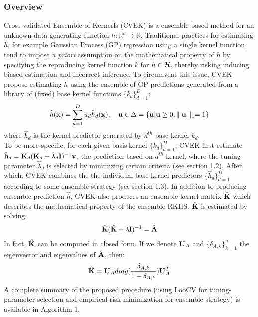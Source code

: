 \documentclass[11pt]{article}
\begin{document}
\subsubsection{{Overview}}
Cross-validated Ensemble of Kernerls (CVEK) \citep{liu_robust_2017} is a ensemble-based method for an unknown data-generating function $h: \mathbb{R}^p\rightarrow \mathbb{R}$. Traditional practices for estimating $h$, for example  Gaussian Process (GP) regression using a single kernel function, tend to impose \textit{a priori} assumption on the mathematical property of $h$ by specifying the reproducing kernel function $k$ for $h \in {\cal H}$, thereby risking inducing biased estimation and incorrect inference. To circumvent this issue, CVEK propose   estimating $h$ using the ensemble of GP predictions generated from a library of (fixed) base kernel functions $\{k_d\}_{d=1}^D$:
\begin{align}
\hat{h}({\bf x})=\sum_{d=1}^D u_d\hat{h}_d({\bf x}), \quad {\bf u} \in \Delta=\{{\bf u} | {\bf u} \geq 0, \parallel {\bf u} \parallel_1=1\}
\end{align}
where $\hat{h}_d$ is the kernel predictor generated by $d^{th}$ base kernel $k_d$.\\
To be more specific, for each given basis kernel $\{k_d\}_{d=1}^D$, CVEK first estimate $\hat{{\bf h}}_d={\bf K}_d({\bf K}_d+\hat{\lambda}_d{\bf I})^{-1}{\bf y}$, the prediction based on $d^{th}$ kernel, where the tuning parameter $\hat{\lambda}_d$ is selected by minimizing certain criteria (see section 1.2). After which, CVEK combines the the individual base kernel predictors $\{\hat{h}_d\}_{d=1}^D$ according to some ensemble strategy (see section 1.3). In addition to producing ensemble prediction $\hat{h}$, CVEK also produces an ensemble kernel matrix $\hat{{\bf K}}$ which describes the mathematical property of the ensemble RKHS. $\hat{{\bf K}}$ is estimated by solving:
\begin{align*}
\hat{{\bf K}}(\hat{{\bf K}}+\lambda {\bf I})^{-1}=\hat{{\bf A}}
\end{align*}
In fact, $\hat{{\bf K}}$ can be computed in closed form. If we denote ${\bf U}_A$ and $\{\delta_{A,k}\}_{k=1}^n$ the eigenvector and eigenvalues of $\hat{{\bf A}}$, then:
\begin{align*}
\hat{{\bf K}}={\bf U}_A diag(\frac{\delta_{A,k}}{1-\delta_{A,k}}){\bf U}_A^T
\end{align*}
A complete summary of the proposed procedure (using LooCV for tuning-parameter selection and empirical risk minimization for ensemble strategy) is available in Algorithm 1.
\end{document}
